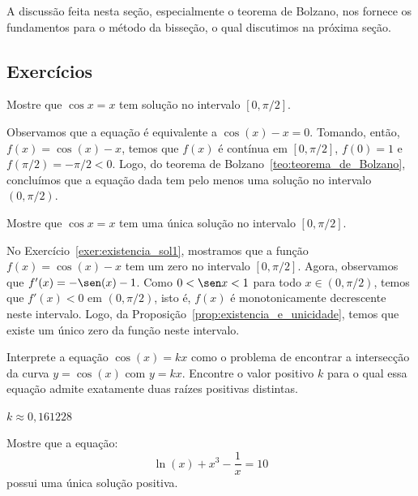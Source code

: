 A discussão feita nesta seção, especialmente o teorema de Bolzano, nos fornece os fundamentos para o método da bisseção, o qual discutimos na próxima seção.

\subsection*{Exercícios}
\begin{exer}\label{exer:existencia_sol1}
  Mostre que $\cos x = x$ tem solução no intervalo $[0, \pi/2]$.
\end{exer}
\begin{resp}

  Observamos que a equação é equivalente a $\cos(x) - x = 0$. Tomando, então, $f(x) = \cos(x) - x$, temos que $f(x)$ é contínua em $[0, \pi/2]$, $f(0) = 1$ e $f(\pi/2) = -\pi/2 < 0$. Logo, do teorema de Bolzano~\ref{teo:teorema_de_Bolzano}, concluímos que a equação dada tem pelo menos uma solução no intervalo $(0, \pi/2)$.

\end{resp}

\begin{exer}
  Mostre que $\cos x = x$ tem uma única solução no intervalo $[0, \pi/2]$.
\end{exer}
\begin{resp}

    No Exercício~\ref{exer:existencia_sol1}, mostramos que a função $f(x) = \cos(x) - x$ tem um zero no intervalo $[0, \pi/2]$. Agora, observamos que $f'(x) = -\sen(x) - 1$. Como $0 < \sen x < 1$ para todo $x\in (0, \pi/2)$, temos que $f'(x) < 0$ em $(0, \pi/2)$, isto é, $f(x)$ é monotonicamente decrescente neste intervalo. Logo, da Proposição~\ref{prop:existencia_e_unicidade}, temos que existe um único zero da função neste intervalo.

\end{resp}

\begin{exer} Interprete a equação $\cos(x)=kx$ como o problema de encontrar a intersecção da curva $y=\cos(x)$ com $y=kx$. Encontre o valor positivo $k$ para o qual essa equação admite exatamente duas raízes positivas distintas.
\end{exer}
\begin{resp}

    $k\approx 0,161228$

\end{resp}


\begin{exer}Mostre que a equação:
  \begin{equation}
    \ln(x)+x^3-\frac{1}{x}=10
  \end{equation}
possui uma única solução positiva.
\end{exer}

